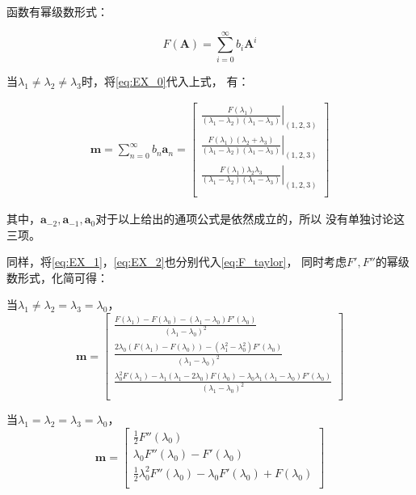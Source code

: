 \documentclass[UTF8,zihao=5]{ctexart}
\newcommand{\bm}[1]{{\mathbf{#1}}}
\begin{document}
函数有幂级数形式：

\begin{equation}
    F(\bm{A})=\sum_{i=0}^\infty{b_i\bm{A}^i}
    \label{eq:F_taylor}
\end{equation}



当$\lambda_1\neq\lambda_2\neq\lambda_3$时，将\eqref{eq:EX_0}代入上式，
有：

\begin{equation}
    \begin{aligned}
        \bm{m}=\sum_{n=0}^\infty {b_n\bm{a}_n}=\begin{bmatrix}
            \left.\frac{F(\lambda_1)}{(\lambda_1-\lambda_2)(\lambda_1-\lambda_3)}\right|_{(1,2,3)}\\
        \left.\frac{F(\lambda_1)(\lambda_2+\lambda_3)}{(\lambda_1-\lambda_2)(\lambda_1-\lambda_3)}\right|_{(1,2,3)}\\
        \left.\frac{F(\lambda_1)\lambda_2\lambda_3}{(\lambda_1-\lambda_2)(\lambda_1-\lambda_3)}\right|_{(1,2,3)}\\
        \end{bmatrix}
    \end{aligned}
\end{equation}

其中，$\bm{a}_{-2}, \bm{a}_{-1}, \bm{a}_0$对于以上给出的通项公式是依然成立的，所以
没有单独讨论这三项。

同样，将\eqref{eq:EX_1}，\eqref{eq:EX_2}也分别代入\eqref{eq:F_taylor}，
同时考虑$F', F''$的幂级数形式，化简可得：

当$\lambda_1\neq\lambda_2=\lambda_3=\lambda_0$，
\begin{equation}
    \bm{m}=\begin{bmatrix}
        \frac{F(\lambda_1)-F(\lambda_0)-(\lambda_1-\lambda_0)F'(\lambda_0)}
        {(\lambda_1-\lambda_0)^2}\\
        \frac{2\lambda_0(F(\lambda_1)-F(\lambda_0))-
        (\lambda_1^2-\lambda_0^2)F'(\lambda_0)}
        {(\lambda_1-\lambda_0)^2}\\
        \frac{\lambda_0^2F(\lambda_1)-\lambda_1(\lambda_1-2\lambda_0)F(\lambda_0)
        -\lambda_0\lambda_1(\lambda_1-\lambda_0)F'(\lambda_0)}
        {(\lambda_1-\lambda_0)^2}\\
    \end{bmatrix}
\end{equation}

当$\lambda_1=\lambda_2=\lambda_3=\lambda_0$，
\begin{equation}
    \bm{m}=\begin{bmatrix}
        \frac{1}{2}F''(\lambda_0)\\
        \lambda_0F''(\lambda_0)-F'(\lambda_0)\\
        \frac{1}{2}\lambda_0^2F''(\lambda_0)-\lambda_0F'(\lambda_0)
        +F(\lambda_0)\\
    \end{bmatrix}
\end{equation}
\end{document}
